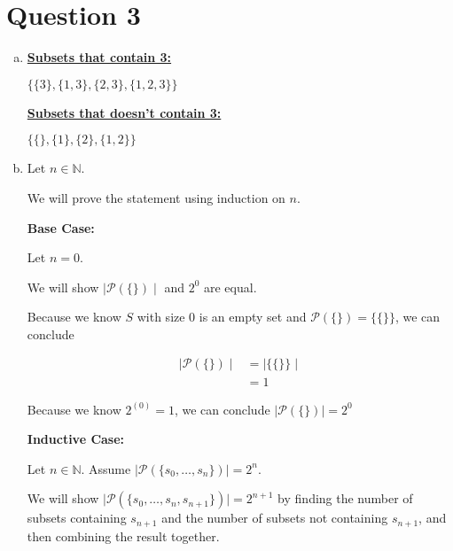 \documentclass[12pt]{article}
\begin{document}
\section*{Question 3}
\begin{enumerate}[a.]
    \item

    \underline{\textbf{Subsets that contain 3:}}

    \bigskip

    $\{ \{3\}, \{1,3\}, \{2,3\}, \{1,2,3\} \}$

    \bigskip

    \underline{\textbf{Subsets that doesn't contain 3:}}

    \bigskip

    $\{ \{\}, \{1\}, \{2\}, \{1,2\} \}$

    \item

    Let $n \in \mathbb{N}$.

    We will prove the statement using induction on $n$.

    \bigskip

    \textbf{Base Case:}

    \bigskip

    Let $n = 0$.

    \bigskip

    We will show $\mid \mathcal{P}(\{\}) \mid$ and $2^0$ are equal.

    \bigskip

    Because we know $S$ with size 0 is an empty set and $\mathcal{P}(\{\}) = \{\{\}\}$,
    we can conclude

    \setcounter{equation}{0}
    \begin{align}
        \mid \mathcal{P}(\{\}) \mid &= \mid \{\{\}\} \mid\\
        &= 1
    \end{align}

    \bigskip

    Because we know $2^{(0)} = 1$, we can conclude $\mid \mathcal{P}(\{\}) \mid = 2^0$

    \bigskip

    \textbf{Inductive Case:}

    \bigskip

    Let $n \in \mathbb{N}$. Assume $\mid \mathcal{P}(\{s_0,\dots,s_n\}) \mid = 2^n$.

    \bigskip

    We will show $\mid \mathcal{P}(\{s_0,\dots,s_n,s_{n+1}\}) \mid = 2^{n+1}$ by
    finding the number of subsets containing $s_{n+1}$ and the number of subsets
    not containing $s_{n+1}$, and then combining the result together.


\end{enumerate}
\end{document}
